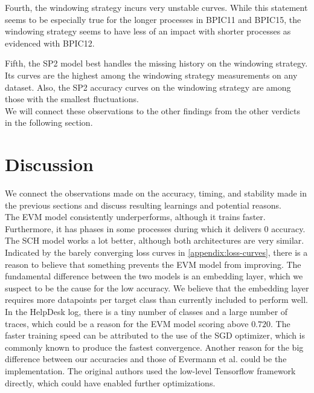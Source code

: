 Fourth, the windowing strategy incurs very unstable curves.
While this statement seems to be especially true for the longer processes in BPIC11 and BPIC15, the windowing strategy seems to have less of an impact with shorter processes as evidenced with BPIC12.

Fifth, the SP2 model best handles the missing history on the windowing strategy.
Its curves are the highest among the windowing strategy measurements on any dataset.
Also, the SP2 accuracy curves on the windowing strategy are among those with the smallest fluctuations.\\

We will connect these observations to the other findings from the other verdicts in the following section.

\section{Discussion}\label{sec:eval:discussion}
We connect the observations made on the accuracy, timing, and stability made in the previous sections and discuss resulting learnings and potential reasons.\\

The EVM model consistently underperforms, although it trains faster.
Furthermore, it has phases in some processes during which it delivers $0$ accuracy.
The SCH model works a lot better, although both architectures are very similar.
Indicated by the barely converging loss curves in \autoref{appendix:loss-curves}, there is a reason to believe that something prevents the EVM model from improving.
The fundamental difference between the two models is an embedding layer, which we suspect to be the cause for the low accuracy.
We believe that the embedding layer requires more datapoints per target class than currently included to perform well.
In the HelpDesk log, there is a tiny number of classes and a large number of traces, which could be a reason for the EVM model scoring above $0.720$.
The faster training speed can be attributed to the use of the SGD optimizer, which is commonly known to produce the fastest convergence.
Another reason for the big difference between our accuracies and those of Evermann et al. could be the implementation.
The original authors used the low-level Tensorflow framework directly, which could have enabled further optimizations.\\

